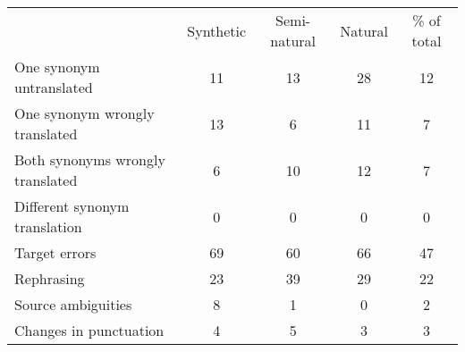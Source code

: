 \begin{tabular}{lcccc}
 & Synthetic & Semi-natural & Natural & \% of total \\
One synonym untranslated & 11 & 13 & 28 & 12\\
One synonym wrongly translated & 13 & 6 & 11 & 7\\
Both synonyms wrongly translated & 6 & 10 & 12 & 7\\
Different synonym translation & 0 & 0 & 0 & 0\\\hline
Target errors & 69 & 60 & 66 & 47\\
Rephrasing & 23 & 39 & 29 & 22\\
Source ambiguities & 8 & 1 & 0 & 2\\
Changes in punctuation & 4 & 5 & 3 & 3\\
\end{tabular}